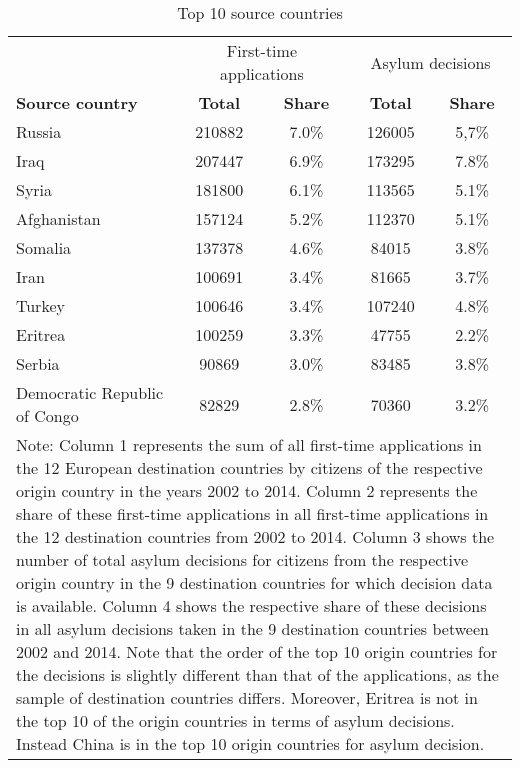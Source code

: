 
\begin{table}[!ht]\centering \footnotesize
\caption{Top 10 source countries}
\begin{tabular}{l c c c c}
\hline \hline
& \multicolumn{2}{c}{First-time applications} & \multicolumn{2}{c}{Asylum decisions}  \\
\textbf{Source country} & \textbf{Total} & \textbf{Share}  & \textbf{Total} & \textbf{Share} \\
\hline 
\smallskip
Russia & 210882 & 7.0\% & 126005 & 5,7\% \\
\smallskip
Iraq & 207447 & 6.9\%  & 173295 & 7.8\% \\
\smallskip
Syria & 181800 & 6.1\%  & 113565 & 5.1\%  \\
\smallskip
Afghanistan & 157124 & 5.2\% & 112370 & 5.1\% \\
\smallskip
Somalia & 137378 & 4.6\% & 84015 & 3.8\%  \\
\smallskip
Iran & 100691 & 3.4\% & 81665 & 3.7\%  \\
\smallskip
Turkey  & 100646 & 3.4\% & 107240 & 4.8\% \\
\smallskip 
Eritrea & 100259 & 3.3\% & 47755 & 2.2\% \\
\smallskip
Serbia & 90869 & 3.0\% & 83485 & 3.8\% \\
\smallskip
Democratic Republic of Congo  & 82829 & 2.8\% &70360 & 3.2\% \\
\hline \hline
\multicolumn{5}{p{11.5cm}}{Note: Column 1 represents the sum of all first-time applications in the 12 European destination countries by citizens of the respective origin country in the years 2002 to 2014. Column 2 represents the share of these first-time applications in all first-time applications in the 12 destination countries from 2002 to 2014. Column 3 shows the number of total asylum decisions for citizens from the respective origin country in the 9 destination countries for which decision data is available. Column 4 shows the respective share of these decisions in all asylum decisions taken in the 9 destination countries between 2002 and 2014. Note that the order of the top 10 origin countries for the decisions is slightly different than that of the applications, as the sample of destination countries differs. Moreover, Eritrea is not in the top 10 of the origin countries in terms of asylum decisions. Instead China is in the top 10 origin countries for asylum decision.}
\end{tabular}
\end{table}